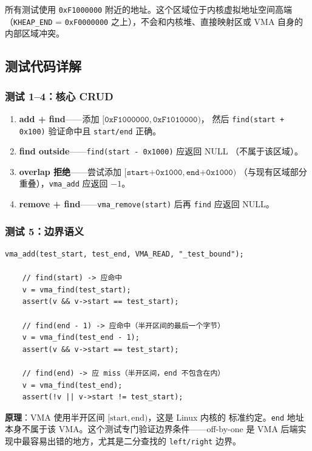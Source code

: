 所有测试使用 \texttt{0xF1000000} 附近的地址。这个区域位于内核虚拟地址空间高端
（\texttt{KHEAP\_END} = \texttt{0xF0000000} 之上），不会和内核堆、直接映射区或 VMA
自身的内部区域冲突。

\subsection{测试代码详解}


\subsubsection{测试 1--4：核心 CRUD}

\begin{enumerate}
  \item \textbf{add + find}——添加 $[\texttt{0xF1000000},\texttt{0xF1010000})$，
    然后 \texttt{find(start + 0x100)} 验证命中且 \texttt{start/end} 正确。
  \item \textbf{find outside}——\texttt{find(start - 0x1000)} 应返回 NULL
    （不属于该区域）。
  \item \textbf{overlap 拒绝}——尝试添加 $[\texttt{start+0x1000},\texttt{end+0x1000})$
    （与现有区域部分重叠），\texttt{vma\_add} 应返回 $-1$。
  \item \textbf{remove + find}——\texttt{vma\_remove(start)} 后再 \texttt{find}
    应返回 NULL。
\end{enumerate}

\subsubsection{测试 5：边界语义}

\begin{lstlisting}[style=cstyle]
    vma_add(test_start, test_end, VMA_READ, "_test_bound");

    // find(start) -> 应命中
    v = vma_find(test_start);
    assert(v && v->start == test_start);

    // find(end - 1) -> 应命中（半开区间的最后一个字节）
    v = vma_find(test_end - 1);
    assert(v && v->start == test_start);

    // find(end) -> 应 miss（半开区间，end 不包含在内）
    v = vma_find(test_end);
    assert(!v || v->start != test_start);
\end{lstlisting}

\textbf{原理}：VMA 使用半开区间 $[\text{start}, \text{end})$，这是 Linux 内核的
标准约定。\texttt{end} 地址本身不属于该 VMA。这个测试专门验证边界条件——off-by-one
是 VMA 后端实现中最容易出错的地方，尤其是二分查找的 \texttt{left/right} 边界。

